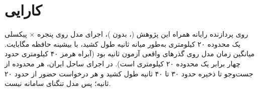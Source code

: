 \section{کارایی}
روی پردازنده رایانه همراه این پژوهش (، بدون )، اجرای مدل روی پنجره
\benchWindow{}$\times$\benchWindow{} پیکسلی یک محدوده ۲۰ کیلومتری به‌طور میانه \benchSeconds{} ثانیه
طول کشید، با بیشینه حافظه \benchMemory{} مگابایت. میانگین زمان مدل روی گذرهای واقعی آزمون
\testModelSeconds{} ثانیه بود (آبراه هرمز ۴۰ کیلومتری حدود چهار برابر یک محدوده ۲۰ کیلومتری
است). در اجرای ساحل ایران، هر محدوده از جست‌وجو تا ذخیره حدود ۳۰ تا ۴۰ ثانیه طول کشید و
هر درخواست حضور  از  حدود ۲۰ ثانیه؛ پس مدل تنگنای سامانه نیست.
